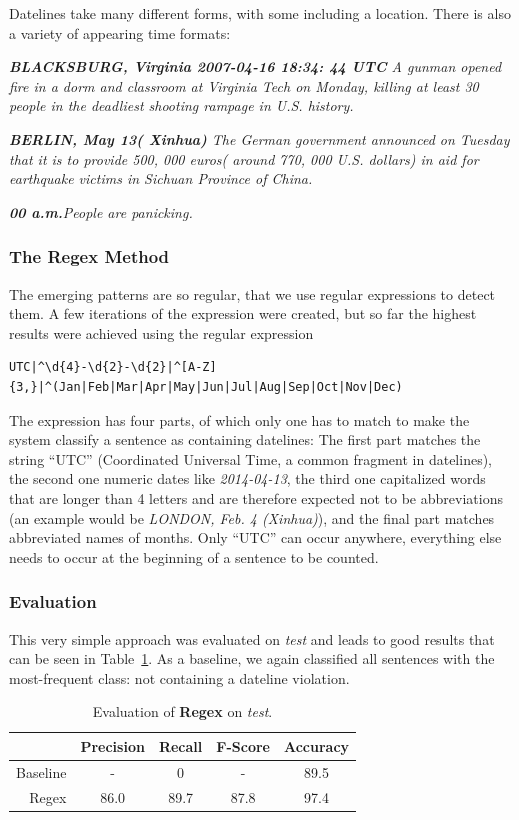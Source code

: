 \documentclass[a4paper,10pt]{scrartcl}
\theoremstyle{style}
\begin{document}
Datelines take many different forms, with some including a location. There is also a variety of appearing time formats:

\quad\textit{\textbf{BLACKSBURG, Virginia 2007-04-16 18:34: 44 UTC} A gunman opened fire in a dorm and classroom at Virginia Tech on Monday, killing at least 30 people in the deadliest shooting rampage in U.S. history.}

\quad\textit{\textbf{BERLIN, May 13( Xinhua)} The German government announced on Tuesday that it is to provide 500, 000 euros( around 770, 000 U.S. dollars) in aid for earthquake victims in Sichuan Province of China.}

\quad\textit{\textbf{00 a.m.}People are panicking.}

\subsubsection{The Regex Method}
The emerging patterns are so regular, that we use regular expressions to detect them. A few iterations of the expression were created, but so far the highest results were achieved using the regular expression

\begin{lstlisting}
UTC|^\d{4}-\d{2}-\d{2}|^[A-Z]{3,}|^(Jan|Feb|Mar|Apr|May|Jun|Jul|Aug|Sep|Oct|Nov|Dec)
\end{lstlisting}

The expression has four parts, of which only one has to match to make the system classify a sentence as containing datelines: The first part matches the string ``UTC'' (Coordinated Universal Time, a common fragment in datelines), the second one numeric dates like \textit{2014-04-13}, the third one capitalized words that are longer than 4 letters and are therefore expected not to be abbreviations (an example would be \textit{LONDON, Feb. 4 (Xinhua)}), and the final part matches abbreviated names of months. Only ``UTC'' can occur anywhere, everything else needs to occur at the beginning of a sentence to be counted.

\subsubsection{Evaluation}
This very simple approach was evaluated on \textit{test} and leads to good results that can be seen in Table~\ref{eval_regex}. As a baseline, we again classified all sentences with the most-frequent class: not containing a dateline violation.

\begin{table}
\begin{center}
\begin{tabular}{r|c|c|c|c|}
  & \textbf{Precision} & \textbf{Recall} & \textbf{F-Score} & \textbf{Accuracy}\\
  \hline
  Baseline & - & 0 & - & 89.5\\
  \hline
  Regex & 86.0 & 89.7 & 87.8 & 97.4\\
  \hline
  \end{tabular}
\end{center}
\caption{Evaluation of \textbf{Regex} on \textit{test}.}
\label{eval_regex}
\end{table}
\end{document}
